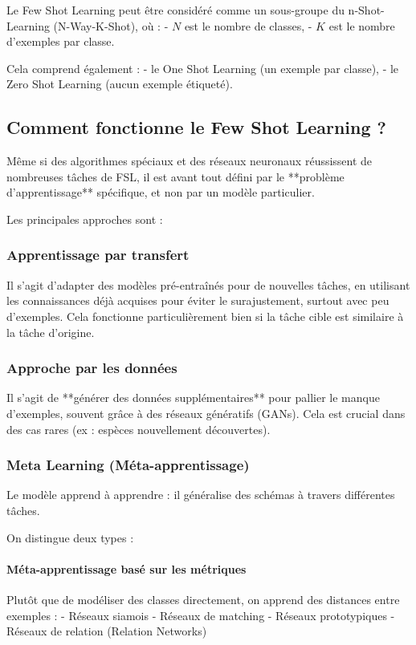 Le Few Shot Learning peut être considéré comme un sous-groupe du n-Shot-Learning
(N-Way-K-Shot), où : - $N$ est le nombre de classes, - $K$ est le nombre
d’exemples par classe.

Cela comprend également : - le One Shot Learning (un exemple par classe), - le Zero
Shot Learning (aucun exemple étiqueté).

\subsection*{Comment fonctionne le Few Shot Learning ?}
Même si des algorithmes spéciaux et des réseaux neuronaux réussissent de nombreuses
tâches de FSL, il est avant tout défini par le **problème d’apprentissage**
spécifique, et non par un modèle particulier.

Les principales approches sont :

\subsubsection*{Apprentissage par transfert}
Il s'agit d'adapter des modèles pré-entraînés pour de nouvelles tâches, en utilisant
les connaissances déjà acquises pour éviter le surajustement, surtout avec peu d'exemples.
Cela fonctionne particulièrement bien si la tâche cible est similaire à la tâche
d’origine.

\subsubsection*{Approche par les données}
Il s'agit de **générer des données supplémentaires** pour pallier le manque d'exemples,
souvent grâce à des réseaux génératifs (GANs). Cela est crucial dans des cas rares
(ex : espèces nouvellement découvertes).

\subsubsection*{Meta Learning (Méta-apprentissage)}
Le modèle apprend à apprendre : il généralise des schémas à travers différentes tâches.

On distingue deux types :

\paragraph*{Méta-apprentissage basé sur les métriques}
Plutôt que de modéliser des classes directement, on apprend des distances entre
exemples : - Réseaux siamois - Réseaux de matching - Réseaux prototypiques -
Réseaux de relation (Relation Networks)


